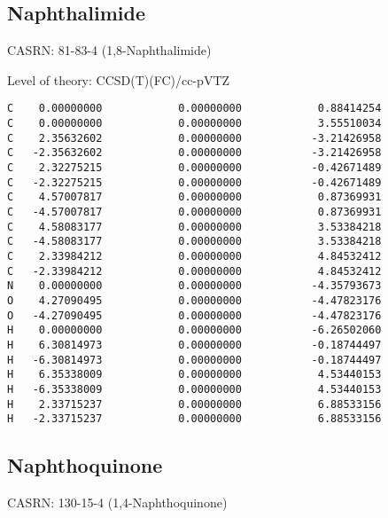 \documentclass[journal=jctcce,manuscript=article,layout=traditional]{achemso}
\newcommand{\TZ}{cc-pVTZ}
\begin{document}
\subsection{Naphthalimide}

CASRN: 81-83-4 (1,8-Naphthalimide)

\begin{singlespace}
\noindent  Level of theory: CCSD(T)(FC)/{\TZ}
\begin{verbatim}
C    0.00000000            0.00000000            0.88414254
C    0.00000000            0.00000000            3.55510034
C    2.35632602            0.00000000           -3.21426958
C   -2.35632602            0.00000000           -3.21426958
C    2.32275215            0.00000000           -0.42671489
C   -2.32275215            0.00000000           -0.42671489
C    4.57007817            0.00000000            0.87369931
C   -4.57007817            0.00000000            0.87369931
C    4.58083177            0.00000000            3.53384218
C   -4.58083177            0.00000000            3.53384218
C    2.33984212            0.00000000            4.84532412
C   -2.33984212            0.00000000            4.84532412
N    0.00000000            0.00000000           -4.35793673
O    4.27090495            0.00000000           -4.47823176
O   -4.27090495            0.00000000           -4.47823176
H    0.00000000            0.00000000           -6.26502060
H    6.30814973            0.00000000           -0.18744497
H   -6.30814973            0.00000000           -0.18744497
H    6.35338009            0.00000000            4.53440153
H   -6.35338009            0.00000000            4.53440153
H    2.33715237            0.00000000            6.88533156
H   -2.33715237            0.00000000            6.88533156
\end{verbatim}
\end{singlespace}

\subsection{Naphthoquinone}

CASRN: 130-15-4 (1,4-Naphthoquinone)
\end{document}
